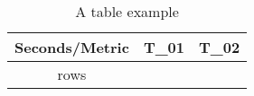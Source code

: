 \begin{table}[H]
\begin{center}
\begin{tabular}{c|cc}
\toprule
Seconds/Metric & T\_01 & T\_02 \\
\midrule
{{rows}}
\bottomrule
\end{tabular}
\end{center}
\caption{A table example}
\label{tab:a-table-example}
\end{table}
